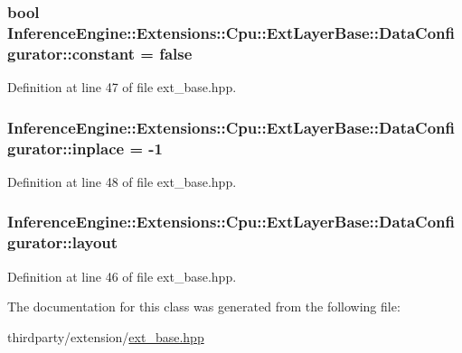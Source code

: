 \subsubsection[{\texorpdfstring{constant}{constant}}]{\setlength{\rightskip}{0pt plus 5cm}bool Inference\+Engine\+::\+Extensions\+::\+Cpu\+::\+Ext\+Layer\+Base\+::\+Data\+Configurator\+::constant = false}\hypertarget{classInferenceEngine_1_1Extensions_1_1Cpu_1_1ExtLayerBase_1_1DataConfigurator_a39953a50f44d763b538e1adcd4465ecd}{}\label{classInferenceEngine_1_1Extensions_1_1Cpu_1_1ExtLayerBase_1_1DataConfigurator_a39953a50f44d763b538e1adcd4465ecd}


Definition at line 47 of file ext\+\_\+base.\+hpp.

\subsubsection[{\texorpdfstring{inplace}{inplace}}]{ Inference\+Engine\+::\+Extensions\+::\+Cpu\+::\+Ext\+Layer\+Base\+::\+Data\+Configurator\+::inplace = -\/1}\hypertarget{classInferenceEngine_1_1Extensions_1_1Cpu_1_1ExtLayerBase_1_1DataConfigurator_a6e0613c25da5e1d2935830677e36b598}{}\label{classInferenceEngine_1_1Extensions_1_1Cpu_1_1ExtLayerBase_1_1DataConfigurator_a6e0613c25da5e1d2935830677e36b598}


Definition at line 48 of file ext\+\_\+base.\+hpp.

\subsubsection[{\texorpdfstring{layout}{layout}}]{ Inference\+Engine\+::\+Extensions\+::\+Cpu\+::\+Ext\+Layer\+Base\+::\+Data\+Configurator\+::layout}\hypertarget{classInferenceEngine_1_1Extensions_1_1Cpu_1_1ExtLayerBase_1_1DataConfigurator_a1c4327ef8fba9d513ba0f7b92a3328c0}{}\label{classInferenceEngine_1_1Extensions_1_1Cpu_1_1ExtLayerBase_1_1DataConfigurator_a1c4327ef8fba9d513ba0f7b92a3328c0}


Definition at line 46 of file ext\+\_\+base.\+hpp.



The documentation for this class was generated from the following file\+:\begin{DoxyCompactItemize}
\item 
thirdparty/extension/\hyperlink{ext__base_8hpp}{ext\+\_\+base.\+hpp}\end{DoxyCompactItemize}
